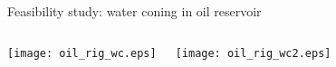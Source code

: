 \documentclass[aspectratio=169]{beamer}
\begin{document}
\begin{frame}{Feasibility study: water coning in oil reservoir}

\begin{columns}[c] 


%

\centering
\texttt{[image: oil\_rig\_wc.eps]}


\centering
\texttt{[image: oil\_rig\_wc2.eps]}

\end{columns}

\end{frame}

%
%
%   
%
%
%
%
%
%
%
%
\end{document}
